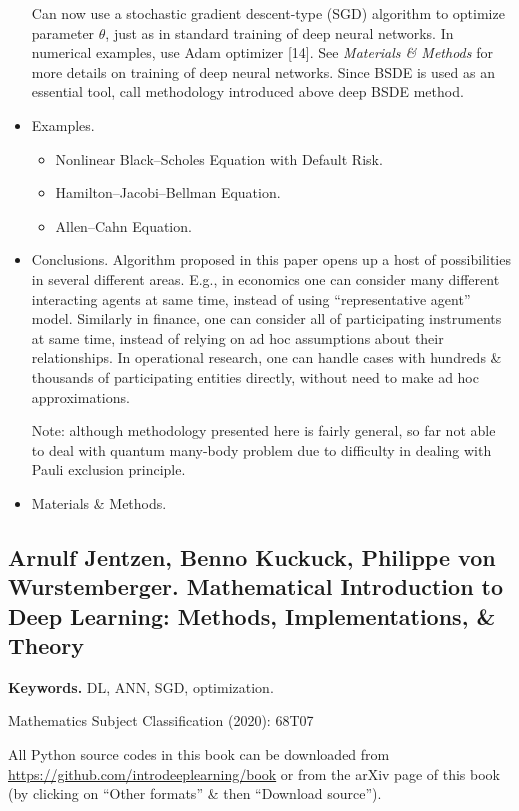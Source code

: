 \documentclass{article}
\begin{document}
\begin{itemize}
	Can now use a stochastic gradient descent-type (SGD) algorithm to optimize parameter $\theta$, just as in standard training of deep neural networks. In numerical examples, use Adam optimizer [14]. See {\it Materials \& Methods} for more details on training of deep neural networks. Since BSDE is used as an essential tool, call methodology introduced above deep BSDE method.
	\item {\sf Examples.}
	\begin{itemize}
		\item {\sf Nonlinear Black--Scholes Equation with Default Risk.}
		\item {\sf Hamilton--Jacobi--Bellman Equation.}
		\item {\sf Allen--Cahn Equation.}
	\end{itemize}
	\item {\sf Conclusions.} Algorithm proposed in this paper opens up a host of possibilities in several different areas. E.g., in economics one can consider many different interacting agents at same time, instead of using ``representative agent'' model. Similarly in finance, one can consider all of participating instruments at same time, instead of relying on ad hoc assumptions about their relationships. In operational research, one can handle cases with hundreds \& thousands of participating entities directly, without need to make ad hoc approximations.

	Note: although methodology presented here is fairly general, so far not able to deal with quantum many-body problem due to difficulty in dealing with Pauli exclusion principle.
	\item {\sf Materials \& Methods.}
\end{itemize}


\subsection{{\sc Arnulf Jentzen, Benno Kuckuck, Philippe von Wurstemberger}. Mathematical Introduction to Deep Learning: Methods, Implementations, \& Theory}
{\bf Keywords.} DL, ANN, SGD, optimization.

Mathematics Subject Classification (2020): 68T07

All Python source codes in this book can be downloaded from \url{https://github.com/introdeeplearning/book} or from the arXiv page of this book (by clicking on ``Other formats'' \& then ``Download source'').
\end{document}
